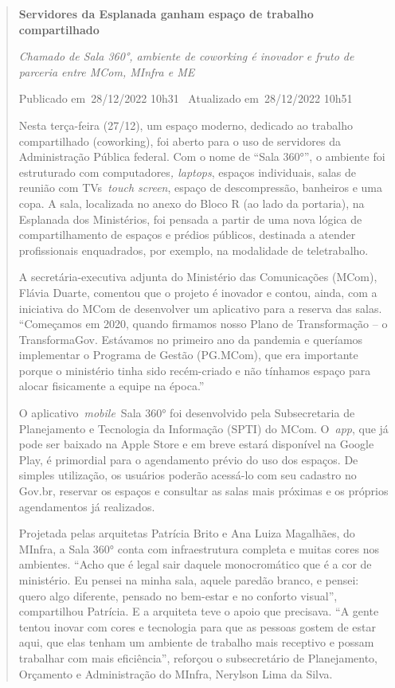\begin{quote}
\textbf{Servidores da Esplanada ganham espaço de trabalho compartilhado}

\emph{Chamado de Sala 360°, ambiente de coworking é inovador e fruto de
parceria entre MCom, MInfra e ME}

Publicado em~28/12/2022 10h31~ Atualizado em~28/12/2022 10h51

Nesta terça-feira (27/12), um espaço moderno, dedicado ao trabalho
compartilhado (coworking), foi aberto para o uso de servidores da
Administração Pública federal. Com o nome de
``Sala 360°'', o ambiente foi estruturado com computadores\emph{, laptops},
espaços individuais, salas de reunião com TVs~\emph{touch screen},
espaço de descompressão, banheiros e uma copa. A sala, localizada no
anexo do Bloco R (ao lado da portaria), na Esplanada dos Ministérios,
foi pensada a partir de uma nova lógica de compartilhamento de espaços e
prédios públicos, destinada a atender profissionais enquadrados, por
exemplo, na modalidade de teletrabalho.

A secretária-executiva adjunta do Ministério das Comunicações (MCom),
Flávia Duarte, comentou que o projeto é inovador e contou, ainda, com a
iniciativa do MCom de desenvolver um aplicativo para a reserva das
salas. ``Começamos em 2020, quando firmamos nosso Plano de Transformação
-- o TransformaGov. Estávamos no primeiro ano da pandemia e queríamos
implementar o Programa de Gestão (PG.MCom), que era importante porque o
ministério tinha sido recém-criado e não tínhamos espaço para alocar
fisicamente a equipe na época.''

O aplicativo~\emph{mobile}~Sala 360° foi desenvolvido pela Subsecretaria
de Planejamento e Tecnologia da Informação (SPTI) do MCom. O~\emph{app},
que já pode ser baixado na Apple Store e em breve estará disponível na
Google Play, é primordial para o agendamento prévio do uso dos espaços.
De simples utilização, os usuários poderão acessá-lo com seu cadastro no
Gov.br, reservar os espaços e consultar as salas mais próximas e os
próprios agendamentos já realizados.

Projetada pelas arquitetas Patrícia Brito e Ana Luiza Magalhães, do
MInfra, a Sala 360° conta com infraestrutura completa e muitas cores nos
ambientes. ``Acho que é legal sair daquele monocromático que é a cor de
ministério. Eu pensei na minha sala, aquele paredão branco, e pensei:
quero algo diferente, pensado no bem-estar e no conforto visual'',
compartilhou Patrícia. E a arquiteta teve o apoio que precisava. ``A
gente tentou inovar com cores e tecnologia para que as pessoas gostem de
estar aqui, que elas tenham um ambiente de trabalho mais receptivo e
possam trabalhar com mais eficiência'', reforçou o subsecretário de
Planejamento, Orçamento e Administração do MInfra, Nerylson Lima da
Silva.


\end{quote}
